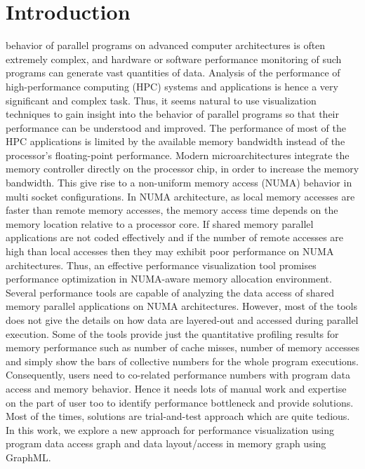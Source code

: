 \section{Introduction}

 behavior of parallel programs on advanced computer architectures is often extremely complex, and hardware or software performance monitoring of such programs can generate vast quantities of data. Analysis of the performance of high-performance computing (HPC) systems and applications is hence a very significant and complex task. Thus, it seems natural to use visualization techniques to gain insight into the behavior of parallel programs so that their performance can be understood and improved. The performance of most of the HPC applications is limited by the available memory bandwidth instead of the processor’s floating-point performance. Modern microarchitectures integrate the memory controller directly on the processor chip, in order to increase the memory bandwidth. This give rise to a non-uniform memory access (NUMA) behavior in multi socket configurations. In NUMA architecture, as local memory accesses are faster than remote memory accesses, the memory access time depends on the memory location relative to a processor core. If shared memory parallel applications are not coded effectively and if the number of remote accesses are high than local accesses then they may exhibit poor performance on NUMA architectures. Thus, an effective performance visualization tool promises performance optimization in NUMA-aware memory allocation environment. Several performance tools are capable of analyzing the data access of shared memory parallel applications on NUMA architectures. However, most of the tools does not give the details on how data are layered-out and accessed during parallel execution. Some of the tools provide just the quantitative profiling results for memory performance such as number of cache misses, number of memory accesses and simply show the bars of collective numbers for the whole program executions. Consequently, users need to co-related performance numbers with program data access and memory behavior. Hence it needs lots of manual work and expertise on the part of user too to identify performance bottleneck and provide solutions. Most of the times, solutions are trial-and-test approach which are quite tedious. In this work, we explore a new approach for performance visualization using program data access graph and data layout/access in memory graph using GraphML.


